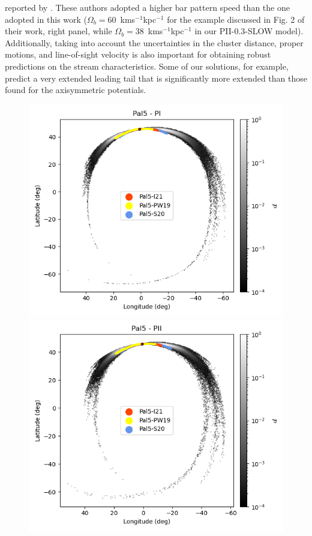 reported by  \citet{2017NatAs...1..633P}. These authors adopted a higher bar pattern speed than the one adopted in this work ($\Omega_b=60$~kms$^{-1}$kpc$^{-1}$ for the example discussed in Fig. 2 of their work, right panel, while $\Omega_b=38$~kms$^{-1}$kpc$^{-1}$ in our PII-0.3-SLOW model). Additionally, taking into account the uncertainties in the cluster distance, proper motions, and line-of-sight velocity is also important for obtaining robust predictions on the stream characteristics. Some of our solutions, for example, predict a very extended leading tail that is significantly more extended than those found for the axisymmetric potentials.

            \twocolumn
            \begin{figure}[h!]
                \begin{center}
                    \includegraphics[clip=true, trim = 0mm 0mm 0mm 0mm, width=0.65\columnwidth]{images/PI_individual_Pal5_galstream-Pal5-l-b.png}
                    \includegraphics[clip=true, trim = 0mm 0mm 0mm 0mm, width=0.65\columnwidth]{images/PII_individual_Pal5_galstream-Pal5-l-b.png}

\end{center}
\end{figure}
